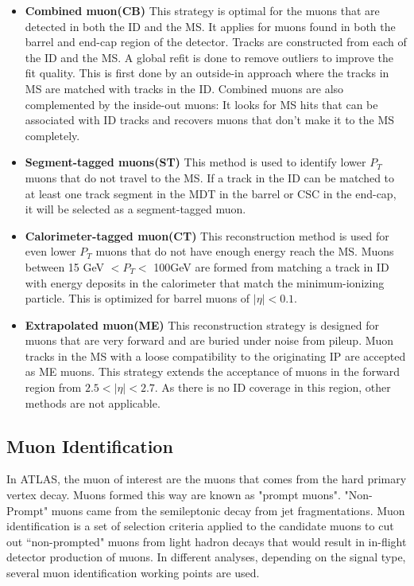 \begin{itemize}
\item \textbf{Combined muon(CB)}
    This strategy is optimal for the muons that are detected in both the ID and the MS. It applies for muons found in both the barrel and end-cap region of the detector. Tracks are constructed from each of the ID and the MS. A global refit is done to remove outliers to improve the fit quality. This is first done by an outside-in approach where the tracks in MS are matched with tracks in the ID. Combined muons are also complemented by the inside-out muons: It looks for MS hits that can be associated with ID tracks and recovers muons that don't make it to the MS completely.

\item \textbf{Segment-tagged muons(ST)}
This method is used to identify lower $P_{T}$ muons that do not travel to the MS. If a track in the ID can be matched to at least one track segment in the MDT in the barrel or CSC in the end-cap, it will be selected as a segment-tagged muon. 

\item \textbf{Calorimeter-tagged muon(CT)}
    This reconstruction method is used for even lower $P_{T}$ muons that do not have enough energy reach the MS. Muons between 15 GeV $< P_{T} < $ 100GeV are formed from matching a track in ID with energy deposits in the calorimeter that match the minimum-ionizing particle. This is optimized for barrel muons of $|\eta| <0.1$. 

\item \textbf{Extrapolated muon(ME)}
    This reconstruction strategy is designed for muons that are very forward and are buried under noise from pileup. Muon tracks in the MS with a loose compatibility to the originating IP are accepted as ME muons. This strategy extends the acceptance of muons in the forward region from $2.5<|\eta|<2.7$. As there is no ID coverage in this region, other methods are not applicable.
\end{itemize}

\subsection{Muon Identification}
In ATLAS, the muon of interest are the muons that comes from the hard primary vertex decay. Muons formed this way are known as "prompt muons". "Non-Prompt" muons came from the semileptonic decay from jet fragmentations. Muon identification is a set of selection criteria applied to the candidate muons to cut out ``non-prompted" muons from light hadron decays that would result in in-flight detector production of muons. In different analyses, depending on the signal type, several muon identification working points are used.

